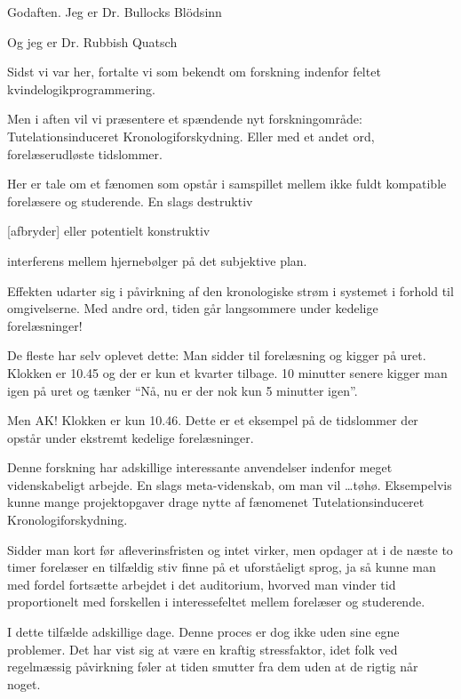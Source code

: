 \documentclass[a4paper,11pt]{article}
\begin{document}
\begin{sketch}


 Godaften. Jeg er Dr. Bullocks Bl\"odsinn

 Og jeg er Dr. Rubbish Quatsch

 Sidst vi var her, fortalte vi som bekendt om forskning indenfor feltet
kvindelogikprogrammering.
 
 Men i aften vil vi præsentere et spændende nyt forskningområde:
Tutelationsinduceret Kronologiforskydning. Eller med et andet ord,
forelæserudløste tidslommer.

 Her er tale om et fænomen som opstår i samspillet mellem ikke fuldt
kompatible forelæsere og studerende. En slags destruktiv

[afbryder] eller potentielt konstruktiv

 interferens mellem hjernebølger på det subjektive plan. 

Effekten udarter sig i påvirkning af den kronologiske strøm i systemet i
forhold til omgivelserne. Med andre ord, tiden går langsommere under kedelige
forelæsninger!

 De fleste har selv oplevet dette: Man sidder til forelæsning og kigger
på uret. Klokken er 10.45 og der er kun et kvarter tilbage. 10 minutter senere
kigger man igen på uret og tænker ``Nå, nu er der nok kun 5 minutter igen''. 

 Men AK! Klokken er kun 10.46. Dette er et eksempel på de tidslommer der
opstår under ekstremt kedelige forelæsninger.  

 Denne forskning har adskillige interessante anvendelser indenfor meget
videnskabeligt arbejde. En slags meta-videnskab, om man vil \ldots tøhø.
Eksempelvis kunne mange projektopgaver drage nytte af fænomenet
Tutelationsinduceret Kronologiforskydning. 

 Sidder man kort før afleverinsfristen
og intet virker, men opdager at i de næste to timer forelæser en tilfældig stiv
finne på et uforståeligt sprog, ja så kunne man med fordel fortsætte arbejdet i
det auditorium, hvorved man vinder tid proportionelt med forskellen i
interessefeltet mellem forelæser og studerende.

 I dette tilfælde adskillige dage. Denne proces er dog ikke uden sine
egne problemer. Det har vist sig at være en kraftig stressfaktor, idet folk ved
regelmæssig påvirkning føler at tiden smutter fra dem uden at de rigtig når
noget. 


\end{sketch}
\end{document}
